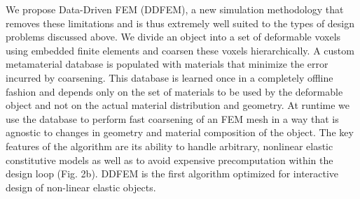 We propose Data-Driven FEM (DDFEM), a new simulation methodology
that removes these limitations and is thus extremely well suited
to the types of design problems discussed above.
We divide an object into a set of deformable voxels using embedded finite
elements and coarsen these voxels hierarchically.
A custom metamaterial database is populated with materials that minimize the error incurred by coarsening.
This database is learned once in a completely offline fashion and depends only on the set of materials to be used by the deformable object and not on the actual material distribution
and geometry.
At runtime we use the database to perform fast coarsening of an FEM mesh in a way that is agnostic to changes in geometry and material composition of the object.
The key features of the algorithm are its ability to handle arbitrary, nonlinear elastic
constitutive models as well as to avoid expensive precomputation
within the design loop (Fig. 2b).
DDFEM is the first algorithm optimized for interactive design of non-linear elastic objects.
